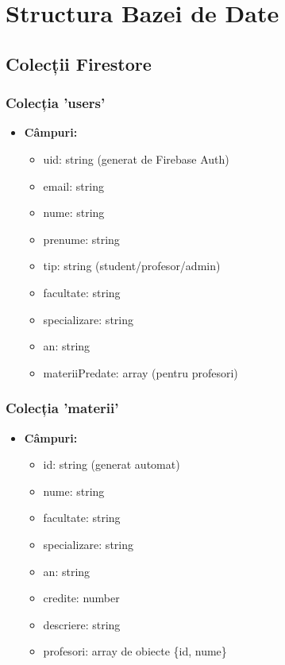 \documentclass[12pt,a4paper]{article}
\begin{document}
\section{Structura Bazei de Date}
\subsection{Colecții Firestore}
\subsubsection{Colecția 'users'}
\begin{itemize}
    \item \textbf{Câmpuri:}
    \begin{itemize}
        \item uid: string (generat de Firebase Auth)
        \item email: string
        \item nume: string
        \item prenume: string
        \item tip: string (student/profesor/admin)
        \item facultate: string
        \item specializare: string
        \item an: string
        \item materiiPredate: array (pentru profesori)
    \end{itemize}
\end{itemize}

\subsubsection{Colecția 'materii'}
\begin{itemize}
    \item \textbf{Câmpuri:}
    \begin{itemize}
        \item id: string (generat automat)
        \item nume: string
        \item facultate: string
        \item specializare: string
        \item an: string
        \item credite: number
        \item descriere: string
        \item profesori: array de obiecte \{id, nume\}
    \end{itemize}
\end{itemize}
\end{document}
